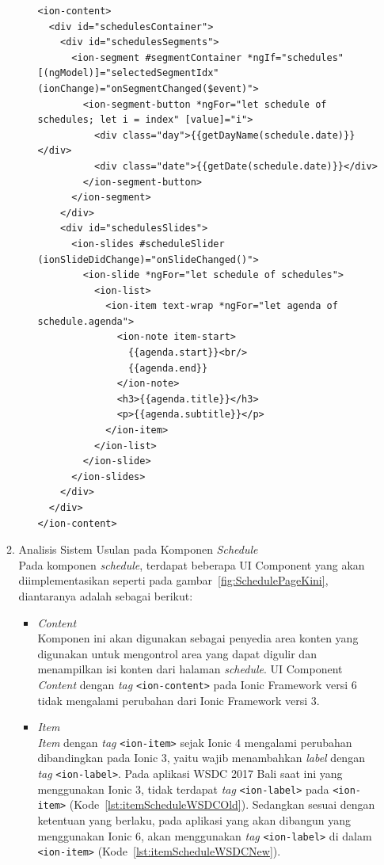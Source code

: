 \begin{enumerate}
\begin{enumerate}
\begin{itemize}
\begin{lstlisting}[label={lst:contentSchedule}, caption=\textit{Content} pada schedule.html]
<ion-content>
  <div id="schedulesContainer">
    <div id="schedulesSegments">
      <ion-segment #segmentContainer *ngIf="schedules" [(ngModel)]="selectedSegmentIdx" (ionChange)="onSegmentChanged($event)">
        <ion-segment-button *ngFor="let schedule of schedules; let i = index" [value]="i">
          <div class="day">{{getDayName(schedule.date)}}</div>
          <div class="date">{{getDate(schedule.date)}}</div>
        </ion-segment-button>
      </ion-segment>
    </div>
    <div id="schedulesSlides">
      <ion-slides #scheduleSlider (ionSlideDidChange)="onSlideChanged()">
        <ion-slide *ngFor="let schedule of schedules">
          <ion-list>
            <ion-item text-wrap *ngFor="let agenda of schedule.agenda">
              <ion-note item-start>
                {{agenda.start}}<br/>
                {{agenda.end}}
              </ion-note>
              <h3>{{agenda.title}}</h3>
              <p>{{agenda.subtitle}}</p>
            </ion-item>
          </ion-list>
        </ion-slide>
      </ion-slides>
    </div>
  </div>
</ion-content>
\end{lstlisting} 
\end{itemize}
		\item  Analisis Sistem Usulan pada Komponen \textit{Schedule} \\
		Pada komponen \textit{schedule}, terdapat beberapa UI Component yang akan diimplementasikan seperti pada gambar~\ref{fig:SchedulePageKini}, diantaranya adalah sebagai berikut:
		\begin{itemize}
			\item \textit{Content} \\
		Komponen ini akan digunakan sebagai penyedia area konten yang digunakan untuk mengontrol area yang dapat digulir dan menampilkan isi konten dari halaman \textit{schedule}. UI Component \textit{Content} dengan \textit{tag} \texttt{<ion-content>} pada Ionic Framework versi 6 tidak mengalami perubahan dari Ionic Framework versi 3.
		
			\item \textit{Item} \\
			\textit{Item} dengan \textit{tag} \texttt{<ion-item>} sejak Ionic 4 mengalami perubahan dibandingkan pada Ionic 3, yaitu wajib menambahkan \textit{label} dengan \textit{tag} \texttt{<ion-label>}. Pada aplikasi WSDC 2017 Bali saat ini yang menggunakan Ionic 3, tidak terdapat \textit{tag} \texttt{<ion-label>} pada \texttt{<ion-item>} (Kode~\ref{lst:itemScheduleWSDCOld}). Sedangkan sesuai dengan ketentuan yang berlaku, pada aplikasi yang akan dibangun yang menggunakan Ionic 6, akan menggunakan \textit{tag} \texttt{<ion-label>} di dalam \texttt{<ion-item>} (Kode~\ref{lst:itemScheduleWSDCNew}).
			

\end{itemize}
\end{enumerate}
\end{enumerate}
